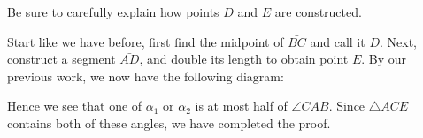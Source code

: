 \documentclass[handout]{ximera}
\begin{document}
\begin{question}
\begin{solution}
\begin{hint}
\begin{image}
\end{image}
Be sure to carefully explain how points $D$ and $E$ are constructed.
\end{hint}
\begin{freeResponse}
Start like we have before, first find the midpoint of $\bar{BC}$ and
call it $D$. Next, construct a segment $\bar{AD}$, and double its
length to obtain point $E$. By our previous work, we now have the
following diagram:
\begin{image}
\end{image}
Hence we see that one of $\alpha_1$ or $\alpha_2$ is at most half of
$\angle CAB$. Since $\triangle ACE$ contains both of these angles, we
have completed the proof.
\end{freeResponse}
\end{solution}
\end{question}

\end{document}
